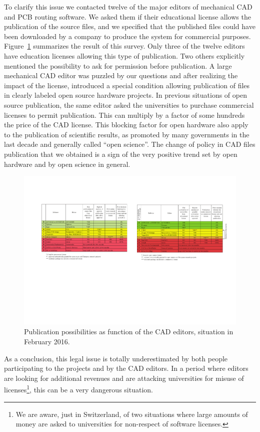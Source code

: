 \documentclass[letterpaper, 10 pt, conference]{ieeeconf}  %
\begin{document}
To clarify this issue we contacted twelve of the major editors of mechanical CAD and PCB routing software.
We asked them if their educational license allows the publication of the source files, and we specified that the published files could have been downloaded by a company to produce the system for commercial purposes.
Figure~\ref{fig:editors} summarizes the result of this survey.
Only three of the twelve editors have education licenses allowing this type of publication. 
Two others explicitly mentioned the possibility to ask for permission before publication.
A large mechanical CAD editor was puzzled by our questions and after realizing the impact of the license, introduced a special condition allowing publication of files in clearly labeled open source hardware projects.
In previous situations of open source publication, the same editor asked the universities to purchase commercial licenses to permit publication.
This can multiply by a factor of some hundreds the price of the CAD license.
This blocking factor for open hardware also apply to the publication of scientific results, as promoted by many governments in the last decade and generally called ``open science''.
The change of policy in CAD files publication that we obtained is a sign of the very positive trend set by open hardware and by open science in general.

\begin{figure}
\centering
\includegraphics[width=\columnwidth]{figures/table}
\caption{Publication possibilities as function of the CAD editors, situation in February 2016.}
\label{fig:editors}
\end{figure}

As a conclusion, this legal issue is totally underestimated by both people participating to the projects and by the CAD editors. 
In a period where editors are looking for additional revenues and are attacking universities for misuse of licenses\footnote{We are aware, just in Switzerland, of two situations where large amounts of money are asked to universities for non-respect of software licenses.}, this can be a very dangerous situation.
\end{document}
